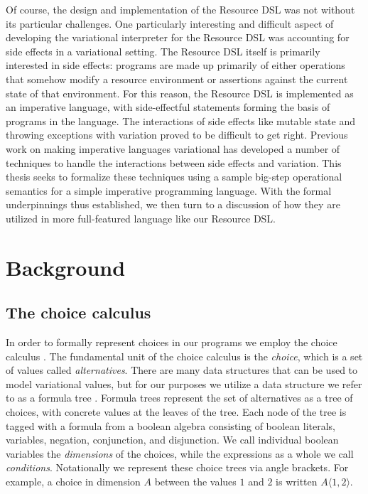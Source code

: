\documentclass[onehalf,11pt]{beavtex}
\newcommand{\tagtree}[3]{#1 \langle #2, #3 \rangle}
\begin{document}
Of course, the design and implementation of the Resource DSL was not without its particular challenges. One particularly interesting and difficult aspect of developing
the variational interpreter for the Resource DSL was accounting for side effects in a variational setting. The Resource DSL itself is primarily interested in side effects: programs are
made up primarily of either operations that somehow modify a resource environment or assertions against the current state of that environment. For this reason, the
Resource DSL is implemented as an imperative language, with side-effectful statements forming the basis of programs in the language. The interactions of side effects
like mutable state and throwing exceptions with variation proved to be difficult to get right. Previous work on making imperative languages variational has developed a
number of techniques to handle the interactions between side effects and variation. This thesis seeks to formalize these techniques using a sample big-step operational
semantics for a simple imperative programming language. With the formal underpinnings thus established, we then turn to a discussion of how they are utilized in more
full-featured language like our Resource DSL.

\chapter{Background}
\label{ch:bg}

\section{The choice calculus}

In order to formally represent choices in our programs we employ the choice
calculus \cite{ericthesis,erwig2011choice}. The fundamental unit of the choice calculus is
the \emph{choice}, which is a set of values called \emph{alternatives}.
There are many data structures that can be used to model
variational values, but for our purposes we utilize a data structure we refer
to as a formula tree \cite{walkingshaw2014projectional,walkingshaw2014variational}.
Formula trees represent the set of alternatives as a tree of choices, with concrete
values at the leaves of the tree. Each node of the tree is tagged with a formula from a boolean
algebra consisting of boolean literals, variables, negation, conjunction, and disjunction. We call individual
boolean variables the \emph{dimensions} of the choices, while the expressions as a whole we call \emph{conditions}. Notationally we represent these choice trees
via angle brackets. For example, a choice in dimension $A$
between the values $1$ and $2$ is written $\tagtree{A}{1}{2}$.
\end{document}

